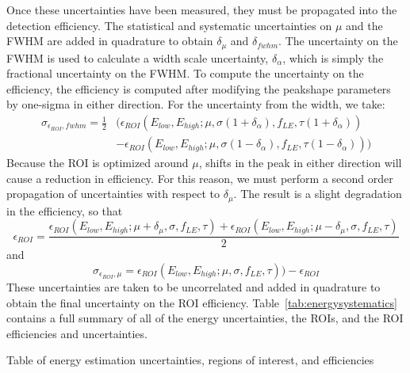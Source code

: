 \documentclass[notitlepage,rmp,aps,10pt]{revtex4-1}
\begin{document}
Once these uncertainties have been measured, they must be propagated into the detection efficiency.
The statistical and systematic uncertainties on $\mu$ and the FWHM are added in quadrature to obtain $\delta_\mu$ and $\delta_{fwhm}$.
The uncertainty on the FWHM is used to calculate a width scale uncertainty, $\delta_\alpha$, which is simply the fractional uncertainty on the FWHM.
To compute the uncertainty on the efficiency, the efficiency is computed after modifying the peakshape parameters by one-sigma in either direction.
For the uncertainty from the width, we take:
\begin{equation}
  \begin{aligned}
    \sigma_{\epsilon_{ROI},fwhm} = \frac{1}{2}&\big(\epsilon_{ROI}(E_{low}, E_{high}; \mu, \sigma(1+\delta_\alpha), f_{LE}, \tau(1+\delta_\alpha)) \\&- \epsilon_{ROI}(E_{low}, E_{high}; \mu, \sigma(1-\delta_\alpha), f_{LE}, \tau(1-\delta_\alpha))\big)
  \end{aligned}
\end{equation}
Because the ROI is optimized around $\mu$, shifts in the peak in either direction will cause a reduction in efficiency.
For this reason, we must perform a second order propagation of uncertainties with respect to $\delta_\mu$.
The result is a slight degradation in the efficiency, so that
\begin{equation}
  \epsilon_{ROI} =  \frac{\epsilon_{ROI}(E_{low}, E_{high}; \mu + \delta_\mu, \sigma, f_{LE}, \tau) + \epsilon_{ROI}(E_{low}, E_{high}; \mu - \delta_\mu, \sigma, f_{LE}, \tau)}{2}
\end{equation}
and
\begin{equation}
  \sigma_{\epsilon_{ROI},\mu} = \epsilon_{ROI}(E_{low}, E_{high}; \mu, \sigma, f_{LE}, \tau)) - \epsilon_{ROI}
\end{equation}
These uncertainties are taken to be uncorrelated and added in quadrature to obtain the final uncertainty on the ROI efficiency.
Table~\ref{tab:energysystematics} contains a full summary of all of the energy uncertainties, the ROIs, and the ROI efficiencies and uncertainties.
\begin{table}
  \caption[Energy systematics]{ \label{tab:energysystematics}
    Table of energy estimation uncertainties, regions of interest, and efficiencies
  }
  \resizebox{\textwidth}{!}{%
   }
\end{table}
\end{document}

